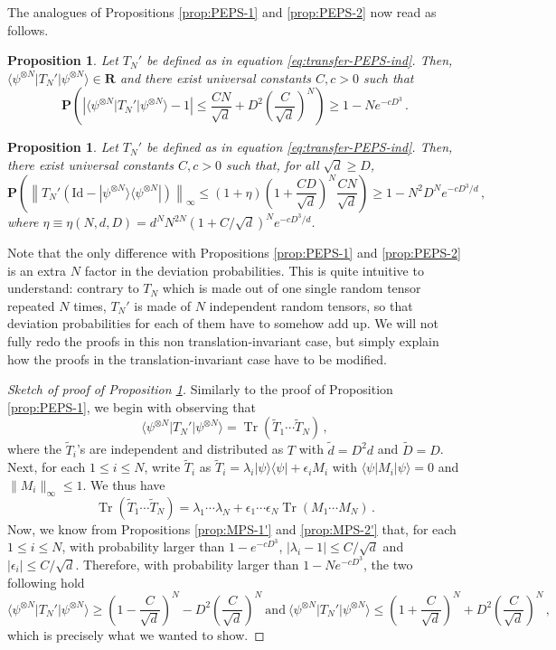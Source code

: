 \documentclass{amsart}
\newtheorem{proposition}[theorem]{Proposition}
\newcommand{\R}{\mathbf{R}}
\renewcommand{\P}{\mathbf{P}}
\renewcommand{\leq}{\leqslant}
\renewcommand{\geq}{\geqslant}
\newcommand{\Id}{\mathrm{Id}}
\DeclareMathOperator{\Tr}{Tr}
\newcommand{\ketbra}[2]{| #1 \rangle\!\langle #2 |}
\newcommand{\bra}[1]{\langle #1 |}
\newcommand{\ket}[1]{| #1 \rangle}
\begin{document}
The analogues of Propositions \ref{prop:PEPS-1} and \ref{prop:PEPS-2} now read as follows.

\begin{proposition} \label{prop:PEPS-1-ind}
    Let $T_N'$ be defined as in equation \eqref{eq:transfer-PEPS-ind}. Then, $\bra{\psi^{\otimes N}}T_N'\ket{\psi^{\otimes N}}\in\R$ and there exist universal constants $C,c>0$ such that
    \[ \P\left( \left| \bra{\psi^{\otimes N}}T_N'\ket{\psi^{\otimes N}} - 1 \right| \leq \frac{CN}{\sqrt{d}}+D^2\left(\frac{C}{\sqrt{d}}\right)^N \right) \geq 1-Ne^{-cD^3} \, . \]
\end{proposition}

\begin{proposition} \label{prop:PEPS-2-ind}
    Let $T_N'$ be defined as in equation \eqref{eq:transfer-PEPS-ind}. Then, there exist universal constants $C,c>0$ such that, for all $\sqrt{d}\geq D$,
    \[ \P\left( \left\|T_N'(\Id-\ketbra{\psi^{\otimes N}}{\psi^{\otimes N}})\right\|_{\infty} \leq (1+\eta)\left(1+\frac{CD}{\sqrt{d}}\right)^N\frac{CN}{\sqrt{d}} \right) \geq 1- N^2D^{N}e^{-cD^3/d} \, , \]
    where $\eta\equiv\eta(N,d,D)= d^N N^{2N} (1+C/\sqrt{d})^N e^{-cD^3/d}$.
\end{proposition}

Note that the only difference with Propositions \ref{prop:PEPS-1} and \ref{prop:PEPS-2} is an extra $N$ factor in the deviation probabilities. This is quite intuitive to understand: contrary to $T_N$ which is made out of one single random tensor repeated $N$ times, $T_N'$ is made of $N$ independent random tensors, so that deviation probabilities for each of them have to somehow add up. We will not fully redo the proofs in this non translation-invariant case, but simply explain how the proofs in the translation-invariant case have to be modified.

\begin{proof}[Sketch of proof of Proposition \ref{prop:PEPS-1-ind}]
    Similarly to the proof of Proposition \ref{prop:PEPS-1}, we begin with observing that
    \[  \bra{\psi^{\otimes N}}T_N'\ket{\psi^{\otimes N}}=\Tr\left(\tilde{T}_1\cdots\tilde{T}_N\right) \, , \]
    where the $\tilde{T}_i$'s are independent and distributed as $T$ with $\tilde{d}=D^2d$ and $\tilde{D}=D$. Next, for each $1\leq i\leq N$, write $\tilde{T}_i$ as $\tilde{T}_i=\lambda_i \ketbra{\psi}{\psi}+\epsilon_i M_i$ with $\bra{\psi}M_i\ket{\psi}=0$ and $\|M_i\|_{\infty}\leq 1$. We thus have
    \[ \Tr\left(\tilde{T}_1\cdots\tilde{T}_N\right) = \lambda_1\cdots\lambda_N + \epsilon_1\cdots\epsilon_N \Tr(M_1\cdots M_N) \, . \]
    Now, we know from Propositions \ref{prop:MPS-1'} and \ref{prop:MPS-2'} that, for each $1\leq i\leq N$, with probability larger than $1-e^{-cD^3}$, $|\lambda_i-1|\leq C/\sqrt{d}$ and $|\epsilon_i|\leq C/\sqrt{d}$. Therefore, with probability larger than $1-Ne^{-cD^3}$,
    the two following hold
    \[ \bra{\psi^{\otimes N}}T_N'\ket{\psi^{\otimes N}} \geq \left(1-\frac{C}{\sqrt{d}}\right)^N - D^2\left(\frac{C}{\sqrt{d}}\right)^N \ \text{and} \  \bra{\psi^{\otimes N}}T_N'\ket{\psi^{\otimes N}} \leq \left(1+\frac{C}{\sqrt{d}}\right)^N + D^2\left(\frac{C}{\sqrt{d}}\right)^N \, , \]
    which is precisely what we wanted to show.
\end{proof}
\end{document}
